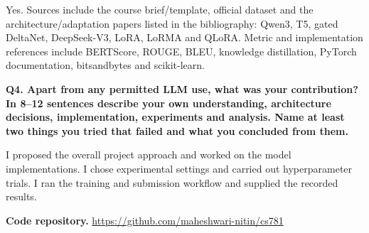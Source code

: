 Yes. Sources include the course brief/template, official dataset and the architecture/adaptation papers
listed in the bibliography: Qwen3, T5, gated DeltaNet, DeepSeek-V3, LoRA, LoRMA and QLoRA. Metric and
implementation references include BERTScore, ROUGE, BLEU, knowledge distillation, PyTorch
documentation, bitsandbytes and scikit-learn.

\medskip
\noindent\textbf{Q4. Apart from any permitted LLM use, what was your contribution? In 8--12 sentences
describe your own understanding, architecture decisions, implementation, experiments and analysis.
Name at least two things you tried that failed and what you concluded from them.}

I proposed the overall project approach and worked on the model implementations.
I chose experimental settings and carried out hyperparameter trials.
I ran the training and submission workflow and supplied the recorded results.

\medskip
\noindent\textbf{Code repository.} \url{https://github.com/maheshwari-nitin/cs781}
